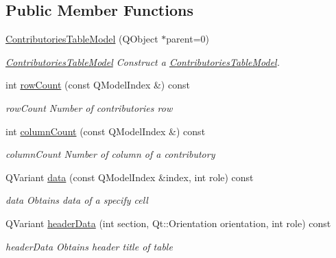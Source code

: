 \subsection*{Public Member Functions}
\begin{DoxyCompactItemize}
\item 
\hyperlink{classGui_1_1Widgets_1_1WdgModels_1_1ContributoriesTableModel_abfc7cdc96006729fa8b03571bb8b586b}{Contributories\+Table\+Model} (Q\+Object $\ast$parent=0)
\begin{DoxyCompactList}\small\item\em \hyperlink{classGui_1_1Widgets_1_1WdgModels_1_1ContributoriesTableModel}{Contributories\+Table\+Model} Construct a \hyperlink{classGui_1_1Widgets_1_1WdgModels_1_1ContributoriesTableModel}{Contributories\+Table\+Model}. \end{DoxyCompactList}\item 
int \hyperlink{classGui_1_1Widgets_1_1WdgModels_1_1ContributoriesTableModel_a4adfd94506448337ceac8504b76531aa}{row\+Count} (const Q\+Model\+Index \&) const 
\begin{DoxyCompactList}\small\item\em row\+Count Number of contributories row \end{DoxyCompactList}\item 
int \hyperlink{classGui_1_1Widgets_1_1WdgModels_1_1ContributoriesTableModel_ab052217cb08f856ecfe465458f95c174}{column\+Count} (const Q\+Model\+Index \&) const 
\begin{DoxyCompactList}\small\item\em column\+Count Number of column of a contributory \end{DoxyCompactList}\item 
Q\+Variant \hyperlink{classGui_1_1Widgets_1_1WdgModels_1_1ContributoriesTableModel_aa95bb13ea63275f96187150a8a2d3972}{data} (const Q\+Model\+Index \&index, int role) const 
\begin{DoxyCompactList}\small\item\em data Obtains data of a specify cell \end{DoxyCompactList}\item 
Q\+Variant \hyperlink{classGui_1_1Widgets_1_1WdgModels_1_1ContributoriesTableModel_ac08635d8660ddd4444d7f2b75ae3d0ef}{header\+Data} (int section, Qt\+::\+Orientation orientation, int role) const 
\begin{DoxyCompactList}\small\item\em header\+Data Obtains header title of table \end{DoxyCompactList}\item 

\end{DoxyCompactItemize}

